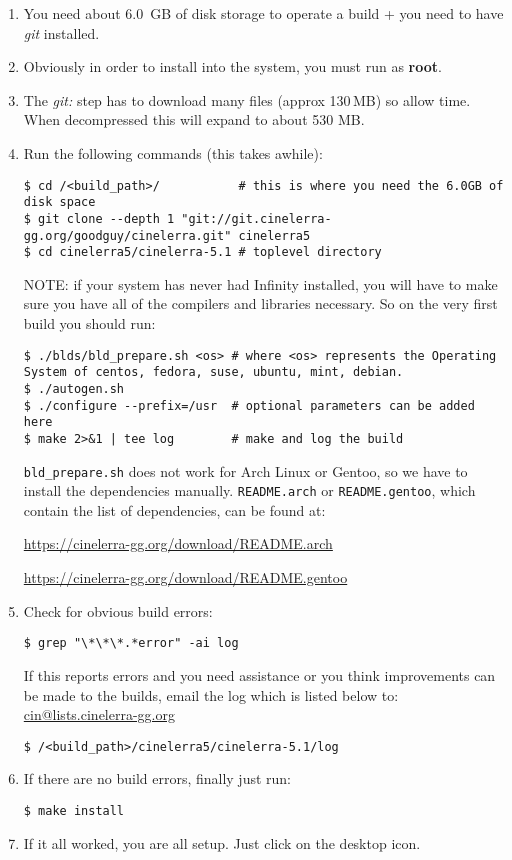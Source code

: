\begin{enumerate}
    \item 
        You need about 6.0 \,GB of disk storage to operate a build + you need to have \textit{git} installed.
    \item  Obviously in order to install into the system, you must run as \textbf{root}.
    \item  The \textit{git:} step has to download many files (approx 130\,MB) so allow time.  When decompressed this will expand to about 530 MB.
    \item  Run the following commands (this takes awhile):

        \begin{lstlisting}[numbers=none]
$ cd /<build_path>/           # this is where you need the 6.0GB of disk space
$ git clone --depth 1 "git://git.cinelerra-gg.org/goodguy/cinelerra.git" cinelerra5 
$ cd cinelerra5/cinelerra-5.1 # toplevel directory
        \end{lstlisting}

        NOTE: if your system has never had \CGG{} Infinity installed, you will have to make sure you have all of the compilers and libraries necessary.  
        So on the very first build you should run:

        \begin{lstlisting}[numbers=none]
$ ./blds/bld_prepare.sh <os> # where <os> represents the Operating System of centos, fedora, suse, ubuntu, mint, debian.
$ ./autogen.sh
$ ./configure --prefix=/usr  # optional parameters can be added here
$ make 2>&1 | tee log        # make and log the build
        \end{lstlisting}
        \texttt{bld\_prepare.sh} does not work for Arch Linux or Gentoo, so we have to install the dependencies manually. \texttt{README.arch} or \texttt{README.gentoo}, which contain the list of dependencies, can be found at: \\ 
{\small \url{https://cinelerra-gg.org/download/README.arch}

	\url{https://cinelerra-gg.org/download/README.gentoo}}
    \item  Check for obvious build errors:
        \begin{lstlisting}[numbers=none]
$ grep "\*\*\*.*error" -ai log
        \end{lstlisting}
        If this reports errors and you need assistance or you think improvements can be made to the builds,
        email the log which is listed below to: \href{mailto:cin@lists.cinelerra-gg.org}{cin@lists.cinelerra-gg.org}
        \begin{lstlisting}[numbers=none]
$ /<build_path>/cinelerra5/cinelerra-5.1/log
        \end{lstlisting}
    \item  If there are no build errors, finally just run:
        \begin{lstlisting}[numbers=none]
   $ make install
        \end{lstlisting}
    \item  If it all worked, you are all setup. Just click on the \CGG{} desktop icon.
\end{enumerate}


